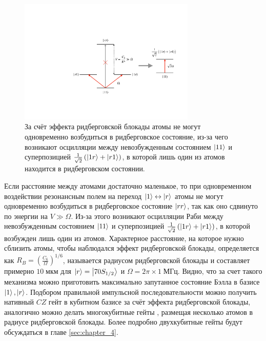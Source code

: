 \begin{figure}
	\centering
	\includegraphics[width=0.75\textwidth]{images/rydberg_blockade_scheme.pdf}
	\caption{За счёт эффекта ридберговской блокады атомы не могут одновременно возбудиться в ридберговское состояние, из-за чего возникают осцилляции между невозбужденным состоянием $\left| 11 \right\rangle$ и суперпозицией $\frac{1}{\sqrt{2}}\left(\left| 1r \right\rangle + \left| r1 \right\rangle\right)$, в которой лишь один из атомов находится в ридберговском состоянии.}
	\label{fig:rydberg_blockade}
\end{figure}

Если расстояние между атомами достаточно маленькое, то при одновременном воздействии резонансным полем на переход $\left| 1 \right\rangle\leftrightarrow\left| r \right\rangle$ атомы не могут одновременно возбудиться в ридберговское состояние $\left| rr \right\rangle$, так как оно сдвинуто по энергии на $V \gg \Omega$. Из-за этого возникают осцилляции Раби между невозбужденным состоянием $\left| 11 \right\rangle$ и суперпозицией $\frac{1}{\sqrt{2}}\left(\left| 1r \right\rangle + \left| r1 \right\rangle\right)$, в которой возбужден лишь один из атомов. Характерное расстояние, на которое нужно сблизить атомы, чтобы наблюдался эффект ридберговской блокады, определяется как $R_B = \left(\frac{C_6}{\Omega}\right)^{1/6}$, называется радиусом ридберговской блокады и составляет примерно $10 \;\text{мкм}$ для $\left| r \right\rangle=\left| 70 S_{1/2} \right\rangle$ и $\Omega = 2\pi \times 1 \;\text{МГц}$. Видно, что за счет такого механизма можно приготовить максимально запутанное состояние Бэлла в базисе $\left| 1 \right\rangle, \left| r \right\rangle$. Подбором правильной импульсной последовательности можно получить нативный $CZ$ гейт в кубитном базисе за счёт эффекта ридберговской блокады, аналогично можно делать многокубитные гейты \cite{toffoli}, размещая несколько атомов в радиусе ридберговской блокады. Более подробно двухкубитные гейты будут обсуждаться в главе \ref{sec:chapter_4}.





